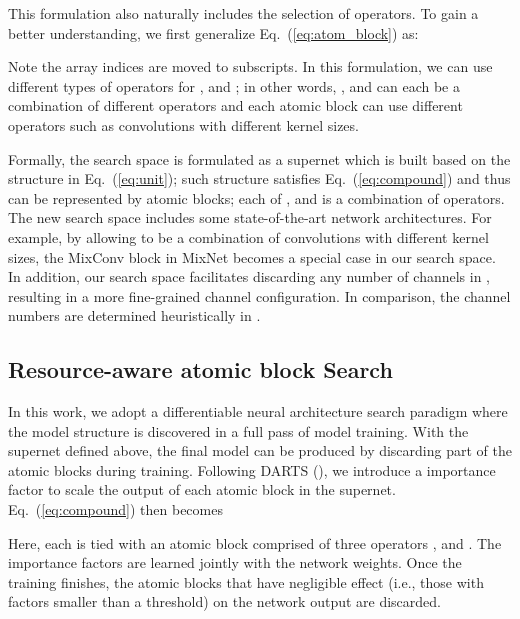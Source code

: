\documentclass{article} \usepackage{iclr2020_conference,times}
\begin{document}
This formulation also naturally includes the selection of operators. To gain a better understanding, we first generalize Eq.~(\ref{eq:atom_block}) as:

Note the array indices  are moved to subscripts. In this formulation, we can use different types of operators for ,  and ; in other words, ,  and  can each be a combination of different operators and each atomic block can use different operators such as convolutions with different kernel sizes.

Formally, the search space is formulated as a supernet which is built based on the structure in Eq.~(\ref{eq:unit}); such structure satisfies Eq.~(\ref{eq:compound}) and thus can be represented by atomic blocks; each of ,  and  is a combination of operators. The new search space includes some state-of-the-art network architectures. For example, by allowing  to be a combination of convolutions with different kernel sizes, the MixConv block in MixNet \citep{tan2019mixnet} becomes a special case in our search space. In addition, our search space facilitates discarding any number of channels in , resulting in a more fine-grained channel configuration. In comparison, the channel numbers are determined heuristically in \cite{tan2019mixnet}.









\subsection{Resource-aware atomic block Search}
\label{sec:flops_targeted_slimming}

In this work, we adopt a differentiable neural architecture search paradigm where the model structure is discovered in a full pass of model training. With the supernet defined above, the final model can be produced by discarding part of the atomic blocks during training. Following DARTS (\cite{hanxiao2019darts}), we introduce a importance factor  to scale the output of each atomic block in the supernet. Eq.~(\ref{eq:compound}) then becomes


Here, each  is tied with an atomic block comprised of three operators , and . The importance factors are learned jointly with the network weights. Once the training finishes, the atomic blocks that have negligible effect (i.e., those with factors smaller than a threshold) on the network output are discarded.
\end{document}
